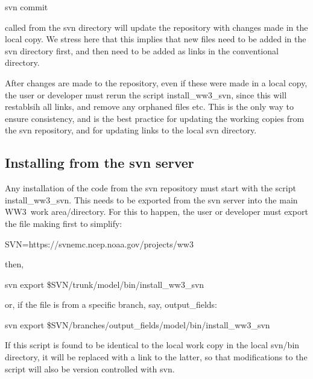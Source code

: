 \documentclass[12pt]{article}
\newcommand{\ws}{WW3}
\newcommand{\file}{\sf}
\begin{document}
\vspace{\baselineskip}
\centerline{\file svn commit}
\vspace{\baselineskip}

\noindent
called from the {\file svn} directory will update the repository with changes made in
the local copy. We stress here that 
this implies that new files need to be added in the {\file svn} directory
first, and then need to be added as links in the conventional directory. 

After changes are made to the repository, even if these were made in a local copy, 
the user or developer must rerun the script {\file install\_ww3\_svn}, since this
will restablsih all links, and remove any orphaned files etc. This is the only way to ensure
consistency, and is the best practice for updating the working copies from the svn repository, 
and for updating links to the local {\file svn} directory.

\subsection{Installing from the svn server}

Any installation of the code from the svn repository must start with the
script {\file install\_ww3\_svn}. This needs to be exported from the svn server
into the main \ws\ work area/directory. For this to happen, the user or developer
must export the file making first to simplify:

\vspace{\baselineskip}
\centerline{\file SVN=https://svnemc.ncep.noaa.gov/projects/ww3}
\vspace{\baselineskip}

then,

\vspace{\baselineskip}
\centerline{\file svn export \$SVN/trunk/model/bin/install\_ww3\_svn}
\vspace{\baselineskip}

or, if the file is from a specific branch, say, output\_fields:

\vspace{\baselineskip}
\centerline{\file svn export \$SVN/branches/output\_fields/model/bin/install\_ww3\_svn}
\vspace{\baselineskip}

\noindent
If this script is found to be identical to the local work copy in the local
{\file svn/bin} directory, it will be replaced with a link to the latter, so
that modifications to the script will also be version controlled with svn.
\end{document}
